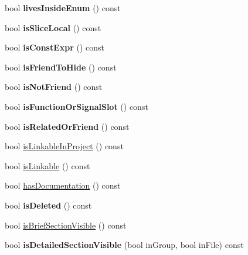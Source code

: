 \begin{DoxyCompactItemize}
bool {\bfseries lives\+Inside\+Enum} () const
\item 
\mbox{\label{class_member_def_a685c7d7392d607d2b726b20a59e87a38}} 
bool {\bfseries is\+Slice\+Local} () const
\item 
\mbox{\label{class_member_def_a2b73015f22c1f2c7f22f4fa4ad22baf0}} 
bool {\bfseries is\+Const\+Expr} () const
\item 
\mbox{\label{class_member_def_a41b0831acc330bf8f2d15be2b1fde668}} 
bool {\bfseries is\+Friend\+To\+Hide} () const
\item 
\mbox{\label{class_member_def_a3f5530ca8f8a0f76e55811c2d00cb314}} 
bool {\bfseries is\+Not\+Friend} () const
\item 
\mbox{\label{class_member_def_a6170336b9fa5a38a49a1c82dc062af71}} 
bool {\bfseries is\+Function\+Or\+Signal\+Slot} () const
\item 
\mbox{\label{class_member_def_aeb06e7269d96792ac306953e14b85615}} 
bool {\bfseries is\+Related\+Or\+Friend} () const
\item 
bool \mbox{\hyperlink{class_member_def_ab53677dd2218300ee758263ec23e8cbd}{is\+Linkable\+In\+Project}} () const
\item 
bool \mbox{\hyperlink{class_member_def_a2a703ac083e9314dc800df330f3eb683}{is\+Linkable}} () const
\item 
bool \mbox{\hyperlink{class_member_def_aa92ecbdc1c50f61e84d2af414b551d4c}{has\+Documentation}} () const
\item 
\mbox{\label{class_member_def_abec759a426b00ee3219414dc803ba6b4}} 
bool {\bfseries is\+Deleted} () const
\item 
bool \mbox{\hyperlink{class_member_def_ab2e646dc51f598d30d7830852e118a40}{is\+Brief\+Section\+Visible}} () const
\item 
\mbox{\label{class_member_def_ac74474e32173a9683283145a5ac8c313}} 
bool {\bfseries is\+Detailed\+Section\+Visible} (bool in\+Group, bool in\+File) const
\item 
\mbox{\label{class_member_def_a52113d4762193bce40d2bdb7874b95b1}} 

\end{DoxyCompactItemize}
